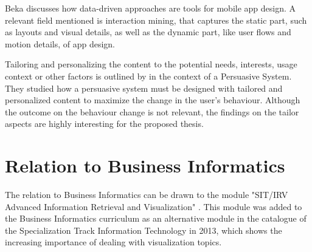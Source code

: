 \documentclass[12pt,a4paper,titlepage,oneside]{article}
\begin{document}
Beka \cite{deka2016data} discusses how data-driven approaches are tools for mobile app design. A relevant field mentioned is interaction mining, that captures the static part, such as layouts and visual details, as well as the dynamic part, like user flows and motion details, of app design.

Tailoring and personalizing the content to the potential needs, interests, usage context or other factors is outlined by \cite{oinas2009persuasive} in the context of a Persuasive System. They studied how a persuasive system must be designed with tailored and personalized content to maximize the change in the user's behaviour. Although the outcome on the behaviour change is not relevant, the findings on the tailor aspects are highly interesting for the proposed thesis.


\section{Relation to Business Informatics}

The relation to Business Informatics can be drawn to the module "SIT/IRV Advanced Information Retrieval and Visualization" \cite{studienplan2013Online}. This module was added to the Business Informatics curriculum as an alternative module in the catalogue of the Specialization Track Information Technology in 2013, which shows the increasing importance of dealing with visualization topics.
\end{document}
